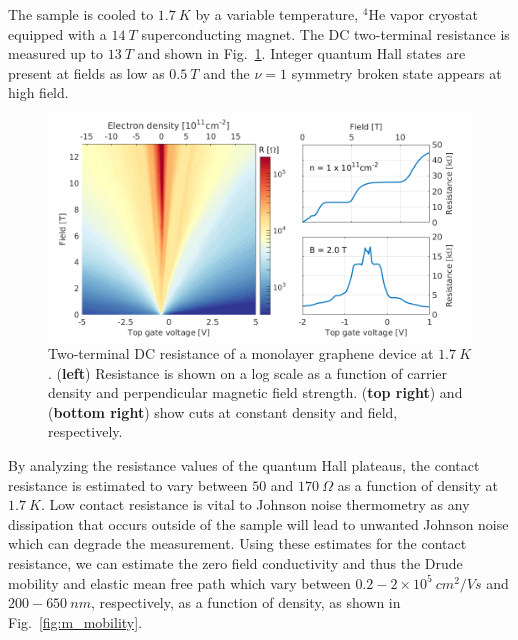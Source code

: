 The sample is cooled to $1.7~K$ by a variable temperature, $^4$He vapor cryostat equipped with a $14~T$ superconducting magnet. The DC two-terminal resistance is measured up to $13~T$ and shown in Fig.~\ref{fig:m_Fan_R}. Integer quantum Hall states are present at fields as low as $0.5~T$ and the $\nu=1$ symmetry broken state appears at high field.
\begin{figure}
\centering
\includegraphics[width=\textwidth]{figures/magneto/Fan_R_cuts.png}
\caption{Two-terminal DC resistance of a monolayer graphene device at $1.7~K$. (\textbf{left}) Resistance is shown on a log scale as a function of carrier density and perpendicular magnetic field strength. (\textbf{top right}) and (\textbf{bottom right}) show cuts at constant density and field, respectively.}
\label{fig:m_Fan_R}
\end{figure}
By analyzing the resistance values of the quantum Hall plateaus, the contact resistance is estimated to vary between $50$ and $170~\Omega$ as a function of density at $1.7~K$. Low contact resistance is vital to Johnson noise thermometry as any dissipation that occurs outside of the sample will lead to unwanted Johnson noise which can degrade the measurement. Using these estimates for the contact resistance, we can estimate the zero field conductivity and thus the Drude mobility and elastic mean free path which vary between $0.2-2\times 10^5~cm^2/Vs$ and $200-650~nm$, respectively, as a function of density, as shown in Fig.~\ref{fig:m_mobility}.
